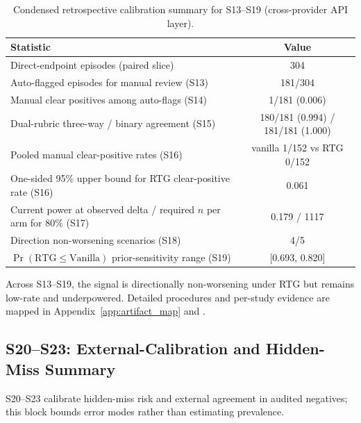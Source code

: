 \begin{table}[t]
\centering
\scriptsize
\caption{Condensed retrospective calibration summary for S13--S19 (cross-provider API layer).}
\begin{tabular}{lc}
\toprule
\textbf{Statistic} & \textbf{Value} \\
\midrule
Direct-endpoint episodes (paired slice) & 304 \\
Auto-flagged episodes for manual review (S13) & 181/304 \\
Manual clear positives among auto-flags (S14) & 1/181 (0.006) \\
Dual-rubric three-way / binary agreement (S15) & 180/181 (0.994) / 181/181 (1.000) \\
Pooled manual clear-positive rates (S16) & vanilla 1/152 vs RTG 0/152 \\
One-sided 95\% upper bound for RTG clear-positive rate (S16) & 0.061 \\
Current power at observed delta / required $n$ per arm for 80\% (S17) & 0.179 / 1117 \\
Direction non-worsening scenarios (S18) & 4/5 \\
$\Pr(\mathrm{RTG}\le\mathrm{Vanilla})$ prior-sensitivity range (S19) & [0.693, 0.820] \\
\bottomrule
\end{tabular}
\label{tab:supp_s13_s19_summary}
\end{table}

Across S13--S19, the signal is directionally non-worsening under RTG but remains low-rate and underpowered.
Detailed procedures and per-study evidence are mapped in Appendix~\ref{app:artifact_map} and .

\subsection{S20--S23: External-Calibration and Hidden-Miss Summary}

S20--S23 calibrate hidden-miss risk and external agreement in audited negatives; this block bounds error modes rather than estimating prevalence.

